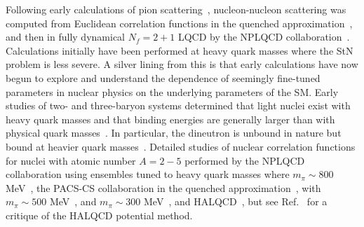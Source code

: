 Following early calculations of pion scattering~\cite{Gupta:1993rn,Fiebig:1999hs,Liu:2001ss,Yamazaki:2004qb,Beane:2005rj,Aoki:2005uf}, nucleon-nucleon scattering was computed from Euclidean correlation functions in the quenched approximation~\cite{Gupta:1993rn,Fukugita:1994na}, and then in fully dynamical $N_f=2+1$ LQCD by the NPLQCD collaboration~\cite{Beane:2006mx}.
Calculations initially have been performed at heavy quark masses where the StN problem is less severe.
A silver lining from this is that early calculations have now begun to explore and understand the dependence of seemingly fine-tuned parameters in nuclear physics on the underlying parameters of the SM.
Early studies of two- and three-baryon systems determined that light nuclei exist with heavy quark masses and that binding energies are generally larger than with physical quark masses~\cite{Beane:2009gs,Beane:2010em,Yamazaki:2009ua,Beane:2009py,Beane:2009kya,Beane:2011pc,Beane:2011iw,Beane:2011zpa,Beane:2012vq,Yamazaki:2012hi,Beane:2013br,Yamazaki:2015asa,Yamazaki:2015vjn,Orginos:2015aya}.
In particular, the dineutron is unbound in nature but bound at heavier quark masses~\cite{Beane:2011iw}.
Detailed studies of nuclear correlation functions for nuclei with atomic number $A=2-5$ performed by the NPLQCD collaboration using ensembles tuned to heavy quark masses where $m_\pi \sim 800$ MeV~\cite{Beane:2012vq,Beane:2013br},
the PACS-CS collaboration in the quenched approximation~\cite{Yamazaki:2009ua,Yamazaki:2011nd}, with $m_\pi \sim 500$ MeV~\cite{Yamazaki:2012hi}, and $m_\pi \sim 300$ MeV~\cite{Yamazaki:2015asa,Yamazaki:2015vjn},
and HALQCD~\cite{Doi:2011gq,Inoue:2011nq}, but see Ref.~\cite{Savage:2016egr} for a critique of the HALQCD potential method.



